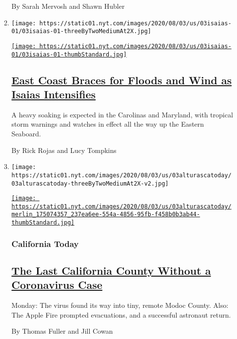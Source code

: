 \begin{enumerate}
\begin{enumerate}
    By Sarah Mervosh and Shawn Hubler
  \item
    \texttt{[image: https://static01.nyt.com/images/2020/08/03/us/03isaias-01/03isaias-01-threeByTwoMediumAt2X.jpg]}

    \href{/2020/08/03/us/isaias-east-coast-landfall.html}{\texttt{[image: https://static01.nyt.com/images/2020/08/03/us/03isaias-01/03isaias-01-thumbStandard.jpg]}}

    \hypertarget{east-coast-braces-for-floods-and-wind-as-isaias-intensifies}{%
    \subsection{\texorpdfstring{\href{/2020/08/03/us/isaias-east-coast-landfall.html}{East
    Coast Braces for Floods and Wind as Isaias
    Intensifies}}{East Coast Braces for Floods and Wind as Isaias Intensifies}}\label{east-coast-braces-for-floods-and-wind-as-isaias-intensifies}}

    A heavy soaking is expected in the Carolinas and Maryland, with
    tropical storm warnings and watches in effect all the way up the
    Eastern Seaboard.

    By Rick Rojas and Lucy Tompkins
  \item
    \texttt{[image: https://static01.nyt.com/images/2020/08/03/us/03alturascatoday/03alturascatoday-threeByTwoMediumAt2X-v2.jpg]}

    \href{/2020/08/03/us/california-coronavirus-modoc-county.html}{\texttt{[image: https://static01.nyt.com/images/2020/08/03/us/03alturascatoday/merlin\_175074357\_237ea6ee-554a-4856-95fb-f458b0b3ab44-thumbStandard.jpg]}}

    \hypertarget{california-today}{%
    \subsubsection{California Today}\label{california-today}}

    \hypertarget{the-last-california-county-without-a-coronavirus-case}{%
    \subsection{\texorpdfstring{\href{/2020/08/03/us/california-coronavirus-modoc-county.html}{The
    Last California County Without a Coronavirus
    Case}}{The Last California County Without a Coronavirus Case}}\label{the-last-california-county-without-a-coronavirus-case}}

    Monday: The virus found its way into tiny, remote Modoc County.
    Also: The Apple Fire prompted evacuations, and a successful
    astronaut return.

    By Thomas Fuller and Jill Cowan
  \end{enumerate}
\end{enumerate}

